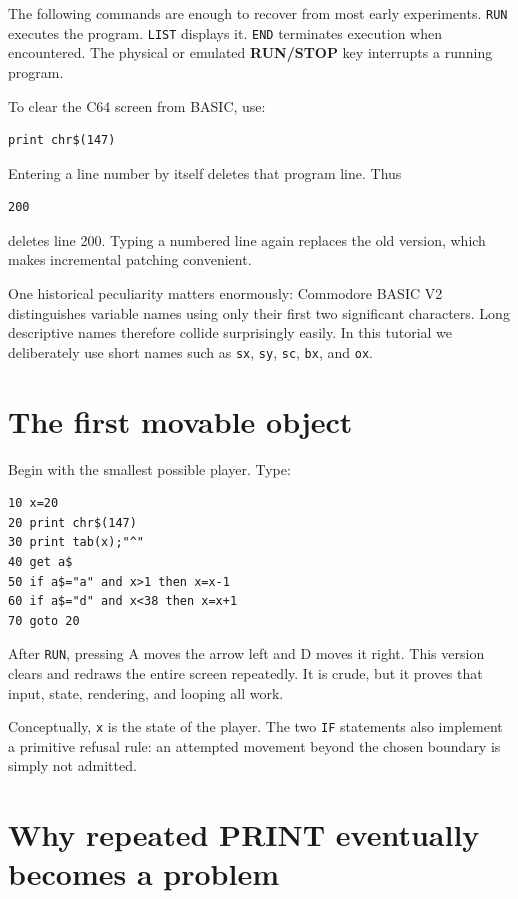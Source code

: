 \documentclass[11pt]{article}
\begin{document}
The following commands are enough to recover from most early experiments. \texttt{RUN} executes the program. \texttt{LIST} displays it. \texttt{END} terminates execution when encountered. The physical or emulated \textbf{RUN/STOP} key interrupts a running program.

To clear the C64 screen from BASIC, use:

\begin{lstlisting}[style=basic]
print chr$(147)
\end{lstlisting}

Entering a line number by itself deletes that program line. Thus

\begin{lstlisting}[style=basic]
200
\end{lstlisting}

deletes line 200. Typing a numbered line again replaces the old version, which makes incremental patching convenient.

One historical peculiarity matters enormously: Commodore BASIC V2 distinguishes variable names using only their first two significant characters. Long descriptive names therefore collide surprisingly easily. In this tutorial we deliberately use short names such as \texttt{sx}, \texttt{sy}, \texttt{sc}, \texttt{bx}, and \texttt{ox}.

\section{The first movable object}

Begin with the smallest possible player. Type:

\begin{lstlisting}[style=basic]
10 x=20
20 print chr$(147)
30 print tab(x);"^"
40 get a$
50 if a$="a" and x>1 then x=x-1
60 if a$="d" and x<38 then x=x+1
70 goto 20
\end{lstlisting}

After \texttt{RUN}, pressing A moves the arrow left and D moves it right. This version clears and redraws the entire screen repeatedly. It is crude, but it proves that input, state, rendering, and looping all work.

Conceptually, \texttt{x} is the state of the player. The two \texttt{IF} statements also implement a primitive refusal rule: an attempted movement beyond the chosen boundary is simply not admitted.

\section{Why repeated PRINT eventually becomes a problem}
\end{document}
